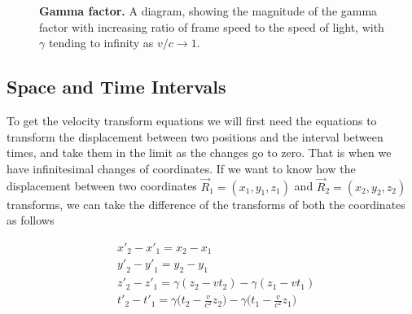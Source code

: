 \begin{figure}[H]
	\centering
	\caption{\textbf{Gamma factor.} A diagram, showing the magnitude of the gamma factor with increasing ratio of frame speed to the speed of light, with ${\gamma}$ tending to infinity as ${v}/{c}\rightarrow 1$.}
	\label{fig: Gamma Factor}
\end{figure}

\subsection{Space and Time Intervals} \label{subsect: Space and Time Intervals}

To get the velocity transform equations we will first need the equations to transform the displacement between two positions and the interval between times, and take them in the limit as the changes go to zero.
That is when we have infinitesimal changes of coordinates.
If we want to know how the displacement between two coordinates ${\vec{R}_1} = (x_1,y_1,z_1)$ and ${\vec{R}_2} = (x_2,y_2,z_2)$ transforms, we can take the difference of the transforms of both the coordinates as follows

\begin{equation}
	\begin{aligned}
		 & {x{'}}_2-{x{'}}_1 = x_2-x_1                                                                                         \\
		 & {y{'}}_2-{y{'}}_1 = y_2-y_1                                                                                         \\
		 & z{'}_2-z{'}_1 = {\gamma} ( z_2- {v} {t}_2)-{\gamma} ( z_1- {v} {t}_1)                                               \\
		 & {t{'}}_2-t{'}_1 = {\gamma} \bigg( {t}_2-\frac{v}{{c}^2} z_2 \bigg)-{\gamma} \bigg( {t}_1-\frac{v}{{c}^2} z_1 \bigg)
	\end{aligned}
\end{equation}

